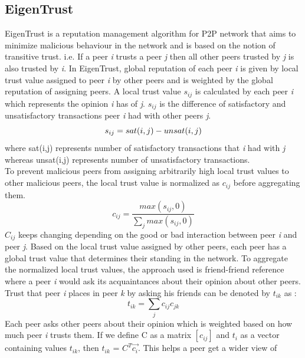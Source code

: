 \subsection{EigenTrust}
EigenTrust is a reputation management algorithm for P2P network that aims to minimize 
malicious behaviour in the network and is based on the notion of transitive trust.
i.e. If a peer \textit{i} trusts a peer \textit{j} then all other peers trusted by 
\textit{j} is also trusted by \textit{i}. 
In EigenTrust, global reputation of each peer \textit{i} is given by local trust value 
assigned to peer \textit{i} by other peers and is weighted by the global reputation 
of assigning peers. 
A local trust value $s_{ij}$ is calculated by 
each peer \textit{i} which represents the opinion \textit{i} has of \textit{j}. $s_{ij}$
is the difference of satisfactory and unsatisfactory transactions peer \textit{i} had 
with other peers \textit{j}.
\begin{equation}
	s_{ij} = sat(i,j) - unsat(i,j) \\ 
\end{equation}
where sat(i,j) represents number of satisfactory transactions that \textit{i} had with 
\textit{j} whereas unsat(i,j) represents number of unsatisfactory transactions. \\
To prevent malicious peers from assigning arbitrarily high local trust values to 
other malicious peers, the local trust value is normalized as $c_{ij}$ before aggregating 
them. 
\begin{equation}
	c_{ij} = \frac{max(s_{ij},0)}{\sum_{j}max(s_{ij},0)}
\end{equation}
$C_{ij}$ keeps changing depending on the good or bad interaction between peer \textit{i} 
and peer \textit{j}.
Based on the local trust value assigned by other peers, each peer has a global trust 
value that determines their standing in the network. To aggregate the normalized local 
trust values, the approach used is friend-friend reference where a peer \textit{i} 
would ask its acquaintances about their opinion about other peers. Trust that 
peer \textit{i} places in peer \textit{k} by asking his friends can be denoted by 
$t_{ik}$ as : 
\begin{equation}
	t_{ik} = \sum_{j} c_{ij} c_{jk}
\end{equation}
Each peer asks other peers about their opinion which is weighted based on how much peer 
\textit{i} trusts them. 
If we define C as a matrix $[c_{ij}]$ and $t_{i}$ as a vector containing values 
$t_{ik}$, then $t_{ik}$ = $C^T\vec{c_{i}}$. This helps a peer get a wider view of 
